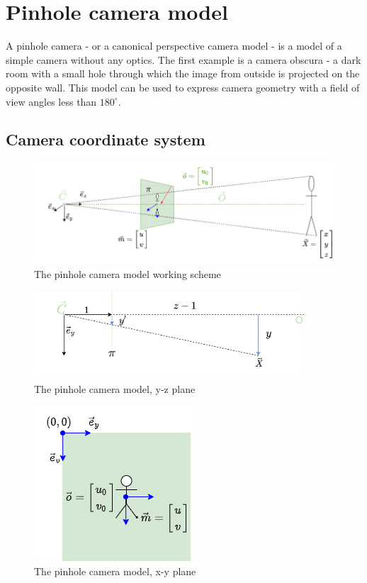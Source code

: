\section{Pinhole camera model}
A pinhole camera - or a canonical perspective camera model - is a model of a simple camera without any optics.
The first example is a camera obscura - a dark room with a small hole through which the image from outside is projected on the opposite wall. 
This model can be used to express camera geometry with a field of view angles less than $180^{\circ}$.

\subsection{Camera coordinate system}
\begin{figure}[h]
    \centering
    \includegraphics[width=1\textwidth]{graphics/td_scene.png}
    \caption{The pinhole camera model working scheme}
    \label{fig:td_scene_3d}
\end{figure}

\begin{figure}[h]
    \centering
    \includegraphics[width=0.9\textwidth]{graphics/td_scene_yz.png}
    \caption{The pinhole camera model, y-z plane}
    \label{fig:td_scene_yz}
\end{figure}

\begin{figure}[h]
    \centering
    \includegraphics[width=.4\textwidth]{graphics/td_scene_xy.png}
    \caption{The pinhole camera model, x-y plane}
    \label{fig:td_scene_xy}
\end{figure}

